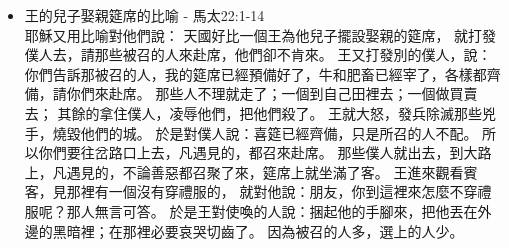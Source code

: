 \begin{itemize}
\begin{itemize}
他要來除滅這些園戶，將葡萄園轉給別人。聽見的人說：這是萬不可的！
耶穌看著他們說：經上記著：匠人所棄的石頭已作了房角的頭塊石頭。這是什麼意思呢？
凡掉在那石頭上的，必要跌碎；那石頭掉在誰的身上，就要把誰砸得稀爛。
文士和祭司長看出這比喻是指著他們說的，當時就想要下手拿他，只是懼怕百姓。
\item{综合}
耶穌就用比喻對他們說：「有人栽了一個葡萄園，周圍圈上籬笆，挖了一個壓酒池，蓋了一座樓，租給園戶，就往外國去住了許久。 到了時候，打發一個僕人到園戶那裡，要從園戶收葡萄園的果子, 叫他們把園中當納的果子交給他。 園戶拿住他，打了他，叫他空手回去。  再打發一個僕人到他們那裡，他們打傷他的頭，並且凌辱他，叫他空手回去。 又打發三個個僕人去，他們就打傷了他，把他推出去殺了他。後又打發好些僕人去，比先前更多，園戶還是照樣待他們,有被他們打的，有被他們殺的。園主說：『我怎麼辦呢？我要打發我的愛子去，或者他們尊敬他。』還有一位是他的愛子，末後又打發他去，意思說：『他們必尊敬我的兒子。』 不料那些園戶彼此說：『這是承受產業的。來吧，我們殺他，占他的產業！產業就歸我們了！』 於是拿住他，殺了他，把他丟在園外。 這樣，葡萄園的主人要怎麼辦呢？他們說：「要下毒手除滅那些惡人，將葡萄園另租給那按著時候交果子的園戶。」耶穌說：他要來除滅那些園戶，將葡萄園轉給別人。  聽見的人說：「這是萬不可的！」耶穌看著他們說：經上寫著說：『匠人所棄的石頭，已做了房角的頭塊石頭。這是主所做的，在我們眼中看為稀奇。』這是什麼意思呢？凡掉在那石頭上的，必要跌碎；那石頭掉在誰的身上，就要把誰砸得稀爛。」這經你們沒有念過嗎？所以我告訴你們：神的國必從你們奪去，賜給那能結果子的百姓。」他們看出這比喻是指著他們說的，就想要捉拿他，只是懼怕百姓，因為眾人以他為先知,於是離開他走了。
\end{itemize}
\item{王的兒子娶親筵席的比喻 - 馬太22:1-14}\\
耶穌又用比喻對他們說：
天國好比一個王為他兒子擺設娶親的筵席，
就打發僕人去，請那些被召的人來赴席，他們卻不肯來。
王又打發別的僕人，說：你們告訴那被召的人，我的筵席已經預備好了，牛和肥畜已經宰了，各樣都齊備，請你們來赴席。
那些人不理就走了；一個到自己田裡去；一個做買賣去；
其餘的拿住僕人，凌辱他們，把他們殺了。
王就大怒，發兵除滅那些兇手，燒毀他們的城。
於是對僕人說：喜筵已經齊備，只是所召的人不配。
所以你們要往岔路口上去，凡遇見的，都召來赴席。
那些僕人就出去，到大路上，凡遇見的，不論善惡都召聚了來，筵席上就坐滿了客。
王進來觀看賓客，見那裡有一個沒有穿禮服的，
就對他說：朋友，你到這裡來怎麼不穿禮服呢？那人無言可答。
於是王對使喚的人說：捆起他的手腳來，把他丟在外邊的黑暗裡；在那裡必要哀哭切齒了。
因為被召的人多，選上的人少。


\end{itemize}
